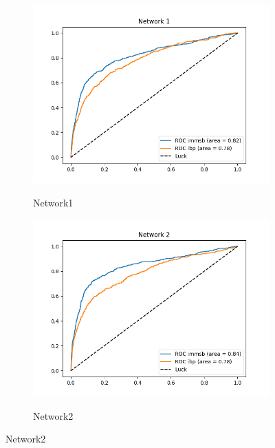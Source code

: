 
\begin{figure}[h]
        \centering
        \begin{subfigure}[b]{0.300\textwidth}
            \centering
            \includegraphics[width=\textwidth]{img/corpus/roc_generator7}
            \label{fig:mean and std of net14}
            \caption {{\small Network1}}    
        \end{subfigure}
        \begin{subfigure}[b]{0.300\textwidth}
            \centering
            \includegraphics[width=\textwidth]{img/corpus/roc_generator12}
            \label{fig:mean and std of net14}
            \caption {{\small Network2}}    
        \end{subfigure}

\end{figure}
